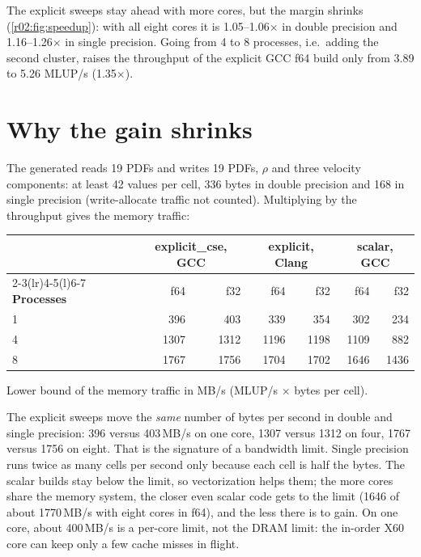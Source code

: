 The explicit sweeps stay ahead with more cores, but the margin shrinks
(\cref{r02:fig:speedup}): with all eight cores it is 1.05--1.06$\times$ in double
precision and 1.16--1.26$\times$ in single precision. Going from 4 to 8 processes,
i.e.\ adding the second cluster, raises the throughput of the explicit GCC f64 build only
from 3.89 to 5.26 MLUP/s (1.35$\times$).

\section{Why the gain shrinks}\label{r02:sec:results-bandwidth}

The generated  reads 19 PDFs and writes 19 PDFs, $\rho$ and three
velocity components: at least 42 values per cell, 336 bytes in double precision and 168
in single precision (write-allocate traffic not counted). Multiplying by the
throughput gives the memory traffic:

\begin{center}\small
\begin{tabular}{@{}lrrrrrr@{}}
  \toprule
  & \multicolumn{2}{c}{\textbf{explicit\_cse, GCC}} & \multicolumn{2}{c}{\textbf{explicit, Clang}} & \multicolumn{2}{c}{\textbf{scalar, GCC}}\\
  \cmidrule(lr){2-3}\cmidrule(lr){4-5}\cmidrule(l){6-7}
  \textbf{Processes} & f64 & f32 & f64 & f32 & f64 & f32\\
  \midrule
  1 & 396 & 403 & 339 & 354 & 302 & 234\\
  4 & 1307 & 1312 & 1196 & 1198 & 1109 & 882\\
  8 & 1767 & 1756 & 1704 & 1702 & 1646 & 1436\\
  \bottomrule
\end{tabular}

\smallskip
{\footnotesize Lower bound of the memory traffic in MB/s (MLUP/s $\times$ bytes per cell).}
\end{center}

The explicit sweeps move the \emph{same} number of bytes per second in double and single
precision: 396 versus 403\,MB/s on one core, 1307 versus 1312 on four, 1767 versus 1756 on
eight. That is the signature of a bandwidth limit. Single precision runs twice as many
cells per second only because each cell is half the bytes. The scalar builds stay below
the limit, so vectorization helps them; the more cores share the memory system, the
closer even scalar code gets to the limit (1646 of about 1770\,MB/s with eight cores in
f64), and the less there is to gain. On one core, about 400\,MB/s is a per-core limit,
not the DRAM limit: the in-order X60 core can keep only a few cache misses in flight.

